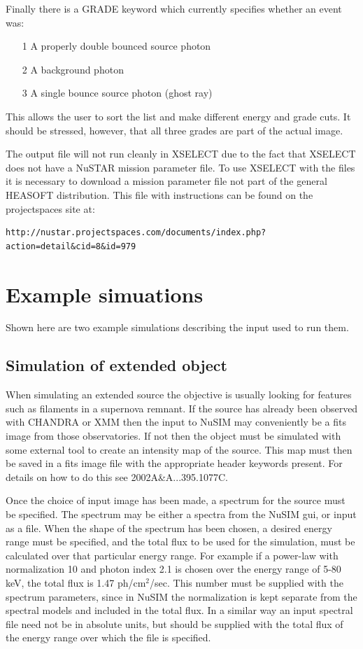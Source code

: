 Finally there is a GRADE keyword which currently specifies whether an event was:
\begin{itemize}
\item[1] A properly double bounced source photon
\item[2] A background photon
\item[3] A single bounce source photon (ghost ray)
\end{itemize} 

This allows the user to sort the list and make different energy and grade cuts. It should be stressed, however, that all three grades are part of the actual image.

The output file will not run cleanly in XSELECT due to the fact that XSELECT does not have a NuSTAR mission parameter file. To use XSELECT with the files it is necessary to download a mission parameter file not part of the general HEASOFT distribution. This file with instructions can be found on the projectspaces site at:
\begin{verbatim}
http://nustar.projectspaces.com/documents/index.php?action=detail&cid=8&id=979
\end{verbatim}


\section{Example simuations}
Shown here are two example simulations describing the input used to run them.

\subsection{Simulation of extended object}
When simulating an extended source the objective is usually looking for features such as filaments in a supernova remnant. If the source has already been observed with CHANDRA or XMM then the input to NuSIM may conveniently be a fits image from those observatories. If not then the object must be simulated with some external tool to create an intensity map of the source. This map must then be saved in a fits image file with the appropriate header keywords present. For details on how to do this see 2002A\&A...395.1077C.

Once the choice of input image has been made, a spectrum for the source must be specified. The spectrum may be either a spectra from the NuSIM gui, or input as a file. When the shape of the spectrum has been chosen, a desired energy range must be specified, and the total flux to be used for the simulation, must be calculated over that particular energy range. For example if a power-law with normalization 10 and photon index 2.1 is chosen over the energy range of 5-80 keV, the total flux is 1.47 ph/cm$^2$/sec. This number must be supplied with the spectrum parameters, since in NuSIM the normalization is kept separate from the spectral models and included in the total flux. In a similar way an input spectral file need not be in absolute units, but should be supplied with the total flux of the energy range over which the file is specified.

